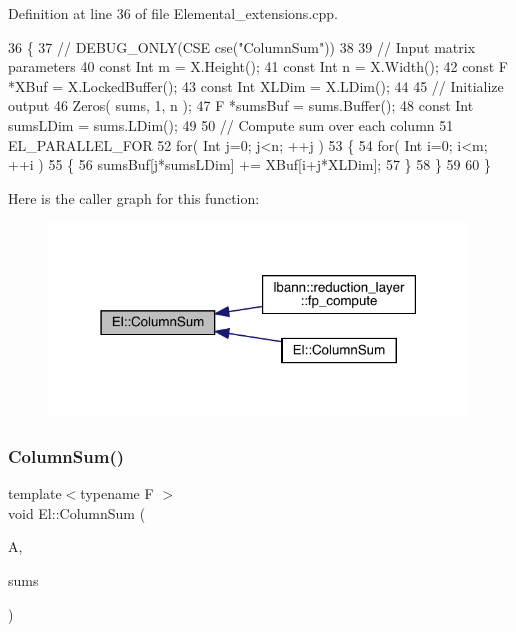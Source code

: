 Definition at line 36 of file Elemental\+\_\+extensions.\+cpp.


\begin{DoxyCode}
36                                                       \{
37 \textcolor{comment}{//    DEBUG\_ONLY(CSE cse("ColumnSum"))}
38 
39     \textcolor{comment}{// Input matrix parameters}
40     \textcolor{keyword}{const} Int m = X.Height();
41     \textcolor{keyword}{const} Int n = X.Width();
42     \textcolor{keyword}{const} F *XBuf = X.LockedBuffer();
43     \textcolor{keyword}{const} Int XLDim = X.LDim();
44 
45     \textcolor{comment}{// Initialize output}
46     Zeros( sums, 1, n );
47     F *sumsBuf = sums.Buffer();
48     \textcolor{keyword}{const} Int sumsLDim = sums.LDim();
49 
50     \textcolor{comment}{// Compute sum over each column}
51     EL\_PARALLEL\_FOR
52     \textcolor{keywordflow}{for}( Int j=0; j<n; ++j )
53     \{
54         \textcolor{keywordflow}{for}( Int i=0; i<m; ++i )
55         \{
56             sumsBuf[j*sumsLDim] += XBuf[i+j*XLDim];
57         \}
58     \}
59 
60 \}
\end{DoxyCode}
Here is the caller graph for this function\+:\nopagebreak
\begin{figure}[H]
\begin{center}
\leavevmode
\includegraphics[width=316pt]{namespaceEl_a09d5c471681b2b48fbe4c5e6bfd0b3d3_icgraph}
\end{center}
\end{figure}
\mbox{\label{namespaceEl_ad446b5d330cc5ae121cc2eef632c4118}} 
\subsubsection{\texorpdfstring{Column\+Sum()}{ColumnSum()}\hspace{0.1cm}{\footnotesize\ttfamily [2/2]}}
{\footnotesize\ttfamily template$<$typename F $>$ \\
void El\+::\+Column\+Sum (\begin{DoxyParamCaption}\item[{const Abstract\+Dist\+Matrix$<$ F $>$ \&}]{A,  }\item[{Abstract\+Dist\+Matrix$<$ F $>$ \&}]{sums }\end{DoxyParamCaption})}



